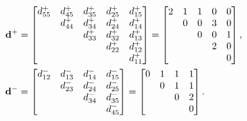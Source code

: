 \documentclass[leqno,11pt]{amsart}
\numberwithin{equation}{section}
\begin{document}
\begin{equation*}
\begin{split}
{\bf d}^+ &=
\begin{bmatrix}
d^+_{55} & d^+_{45} & d^+_{35} & d^+_{25} & d^+_{15} \\
  & d^+_{44} & d^+_{34} & d^+_{24} & d^+_{14} \\
 &   & d^+_{33} & d^+_{32} & d^+_{13} \\
 &   &   & d^+_{22} & d^+_{12} \\
  &   &   &   & d^+_{11} \\
\end{bmatrix}=
\begin{bmatrix}
2 & 1 & 1 & 0 & 0 \\
  & 0 & 0 & 3 & 0 \\
  &   & 0 & 0 & 1 \\
  &   &   & 2 & 0 \\
  &   &   &   & 0 \\
\end{bmatrix}, \\
{\bf d}^-&=
\begin{bmatrix}
d^-_{12} & d^-_{13} & d^-_{14} & d^-_{15}   \\
         & d^-_{23} & d^-_{24} & d^-_{25}   \\
         &          & d^-_{34} & d^-_{35}   \\
         &          &          & d^-_{45}   \\
\end{bmatrix}=
\begin{bmatrix}
0 & 1 & 1 & 1   \\
  & 0 & 1 & 1   \\
  &   & 0 & 2  \\
  &   &   & 0   \\
\end{bmatrix}.
\end{split}
\end{equation*}
\noindent
\vskip 5mm
\end{document}
